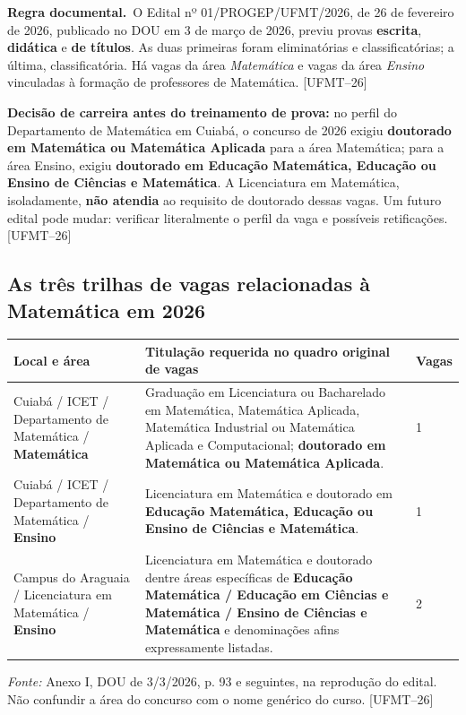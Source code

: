 \documentclass[11pt,a4paper]{article}
\newcommand{\oficial}{\textbf{Regra documental.}~}
\newcommand{\fufmt}{\textsf{[UFMT--26]}}
\begin{document}
\oficial O Edital nº 01/PROGEP/UFMT/2026, de 26 de fevereiro de 2026, publicado no DOU em 3 de março de 2026, previu provas \textbf{escrita}, \textbf{didática} e \textbf{de títulos}. As duas primeiras foram eliminatórias e classificatórias; a última, classificatória. Há vagas da área \emph{Matemática} e vagas da área \emph{Ensino} vinculadas à formação de professores de Matemática. \fufmt

\begin{cuidado}
\textbf{Decisão de carreira antes do treinamento de prova:} no perfil do Departamento de Matemática em Cuiabá, o concurso de 2026 exigiu \textbf{doutorado em Matemática ou Matemática Aplicada} para a área Matemática; para a área Ensino, exigiu \textbf{doutorado em Educação Matemática, Educação ou Ensino de Ciências e Matemática}. A Licenciatura em Matemática, isoladamente, \textbf{não atendia} ao requisito de doutorado dessas vagas. Um futuro edital pode mudar: verificar literalmente o perfil da vaga e possíveis retificações. \fufmt
\end{cuidado}

\subsection{As três trilhas de vagas relacionadas à Matemática em 2026}
\begin{tabularx}{\textwidth}{p{}X p{}}
\toprule
\textbf{Local e área} & \textbf{Titulação requerida no quadro original de vagas} & \textbf{Vagas}\\ \midrule
Cuiabá / ICET / Departamento de Matemática / \textbf{Matemática} & Graduação em Licenciatura ou Bacharelado em Matemática, Matemática Aplicada, Matemática Industrial ou Matemática Aplicada e Computacional; \textbf{doutorado em Matemática ou Matemática Aplicada}. & 1\\
Cuiabá / ICET / Departamento de Matemática / \textbf{Ensino} & Licenciatura em Matemática e doutorado em \textbf{Educação Matemática, Educação ou Ensino de Ciências e Matemática}. & 1\\
Campus do Araguaia / Licenciatura em Matemática / \textbf{Ensino} & Licenciatura em Matemática e doutorado dentre áreas específicas de \textbf{Educação Matemática / Educação em Ciências e Matemática / Ensino de Ciências e Matemática} e denominações afins expressamente listadas. & 2\\
\bottomrule
\end{tabularx}
\textit{Fonte:} Anexo I, DOU de 3/3/2026, p. 93 e seguintes, na reprodução do edital. Não confundir a área do concurso com o nome genérico do curso. \fufmt
\end{document}

